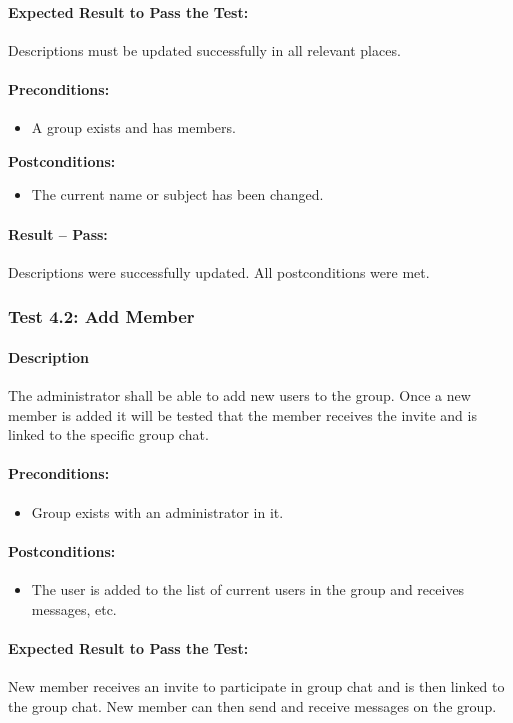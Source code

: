\documentclass[11pt]{article}
\begin{document}
\paragraph{Expected Result to Pass the Test:}
Descriptions must be updated successfully in all relevant places.
\paragraph{Preconditions:} 
\begin{itemize}
\item A group exists and has members.
\end{itemize}
\textbf{Postconditions:}
\begin{itemize}
\item The current name or subject has been changed.
\end{itemize}
\paragraph{Result -- Pass:} Descriptions were successfully updated. All postconditions were met.

\subsubsection{Test 4.2: Add Member}
\paragraph{Description}
The administrator shall be able to add new users to the group. Once a new member is added it will be tested that the member receives the invite and is linked to the specific group chat.
\paragraph{Preconditions:} 
\begin{itemize}
\item Group exists with an administrator in it.
\end{itemize}
\paragraph{Postconditions:}
\begin{itemize}
\item The user is added to the list of current users in the group and receives messages, etc.
\end{itemize}
\paragraph{Expected Result to Pass the Test:}
New member receives an invite to participate in group chat and is then linked to the group chat. New member can then send and receive messages on the group.
\end{document}
